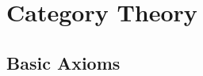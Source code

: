 \documentclass[a4paper,sfsidenotes,openany]{tufte-book}
\theoremstyle{definition}
\begin{document}
\newpage

\chapter{Category Theory}
\begin{fullwidth}
\section{Basic Axioms}

\end{fullwidth}

\newpage

\printindex
\end{document}
